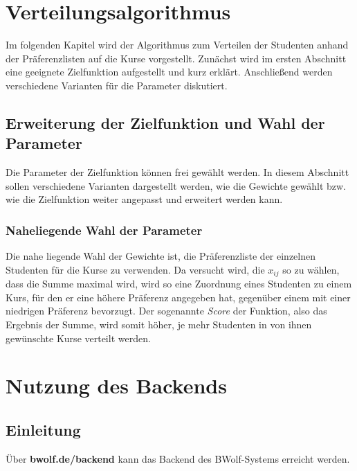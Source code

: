 \chapter{Verteilungsalgorithmus}
\label{chapter:algorithm}
    Im folgenden Kapitel wird der Algorithmus zum Verteilen der Studenten anhand der Präferenzlisten auf die Kurse vorgestellt.
    Zunächst wird im ersten Abschnitt eine geeignete Zielfunktion aufgestellt und kurz erklärt.
    Anschließend werden verschiedene Varianten für die Parameter diskutiert.
        
    \section{Erweiterung der Zielfunktion und Wahl der Parameter}
        Die Parameter der Zielfunktion können frei gewählt werden.
        In diesem Abschnitt sollen verschiedene Varianten dargestellt werden, wie die Gewichte gewählt bzw. wie die Zielfunktion weiter angepasst und erweitert werden kann.
        
        \subsection{Naheliegende Wahl der Parameter}
            Die nahe liegende Wahl der Gewichte ist, die Präferenzliste der einzelnen Studenten für die Kurse zu verwenden.
            Da versucht wird, die $ x_{ij} $ so zu wählen, dass die Summe maximal wird, wird so eine Zuordnung eines Studenten zu einem Kurs, für den er eine höhere Präferenz angegeben hat, gegenüber einem mit einer niedrigen Präferenz bevorzugt.
            Der sogenannte \textit{Score} der Funktion, also das Ergebnis der Summe, wird somit höher, je mehr Studenten in von ihnen gewünschte Kurse verteilt werden.
        
\chapter{Nutzung des Backends}
\label{chapter:use}
  
  \section{Einleitung}
  \label{section:backend_introduction}
  
  Über \textbf{bwolf.de/backend} kann das Backend des BWolf-Systems erreicht werden.
  
